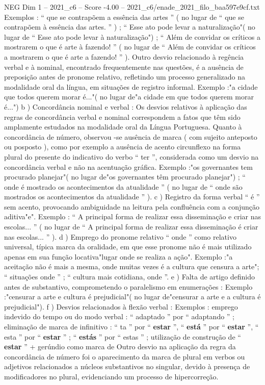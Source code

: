 \begin{textsample}{NEG Dim 1 – 2021\_c6 – Score -4.00 – 2021\_c6/enade\_2021\_filo\_baa597e9cf.txt}
Exemplos : “ que se contrapõem a essência das artes ” ( no lugar de “ que se contrapõem à essência das artes. ” ) ; “ Esse ato pode levar a naturalização"( no lugar de “ Esse ato pode levar à naturalização") ; “ Além de convidar os críticos a mostrarem o que é arte à fazendo! ” ( no lugar de “ Além de convidar os críticos a mostrarem o que é arte a fazendo! ” ).
Outro desvio relacionado à regência verbal e à nominal, encontrado frequentemente nas questões, é a ausência de preposição antes de pronome relativo, refletindo um processo generalizado na modalidade oral da língua, em situações de registro informal.
Exemplo :"a cidade que todos querem morar é..."( no lugar de"a cidade em que todos querem morar é...") b ) Concordância nominal e verbal : Os desvios relativos à aplicação das regras de concordância verbal e nominal correspondem a fatos que têm sido amplamente estudados na modalidade oral da Língua Portuguesa.
Quanto à concordância de número, observou -se ausência de marca ( com sujeito anteposto ou posposto ), como por exemplo a ausência de acento circunflexo na forma plural do presente do indicativo do verbo “ ter ”, considerada como um desvio na concordância verbal e não na acentuação gráfica.
Exemplo :"os governantes tem procurado planejar"( no lugar de"os governantes têm procurado planejar") ; “ onde é mostrado os acontecimentos da atualidade ” ( no lugar de “ onde são mostrados os acontecimentos da atualidade ” ). c ) Registro da forma verbal “ é ” sem acento, provocando ambiguidade na leitura pela confluência com a conjunção aditiva"e".
Exemplo : “ A principal forma de realizar essa disseminação e criar nas escolas... ” ( no lugar de “ A principal forma de realizar essa disseminação é criar nas escolas... ” ). d ) Emprego do pronome relativo “ onde ” como relativo universal, típica marca da oralidade, em que esse pronome não é mais utilizado apenas em sua função locativa"lugar onde se realiza a ação".
Exemplo :"a aceitação não é mais a mesma, onde muitas vezes é a cultura que censura a arte"; “ situações onde ” ; “ cultura mais cotidiana, onde ”. e ) Falta de artigo definido antes de substantivo, comprometendo o paralelismo em enumerações : Exemplo :"censurar a arte e cultura é prejudicial"( no lugar de"censurar a arte e a cultura é prejudicial"). f ) Desvios relacionados à flexão verbal : Exemplos : emprego indevido do tempo ou do modo verbal : “ adaptado ” por “ adaptando ” ; eliminação de marca de infinitivo : “ ta ” por “ \textbf{estar} ”, “ \textbf{está} ” por “ \textbf{estar} ”, “ esta ” por “ \textbf{estar} ” ; “ \textbf{estás} ” por “ estas ” ; utilização de construção de “ \textbf{estar} ” + gerúndio como marca de Outro desvio na aplicação da regra da concordância de número foi o aparecimento da marca de plural em verbos ou adjetivos relacionados a núcleos substantivos no singular, devido à presença de modificadores no plural, evidenciando um processo de hipercorreção.

\end{textsample}
